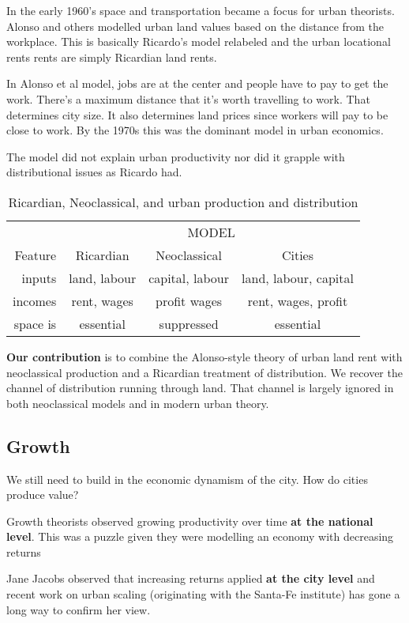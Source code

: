 \documentclass[]{article}
\begin{document}
In the early 1960’s space and transportation became a focus for urban theorists. Alonso and others modelled urban land values based on the distance from the workplace. This is basically Ricardo’s model relabeled and the urban locational rents rents are simply Ricardian land rents.

In Alonso et al model, jobs are at the center and people have to pay to get the work. There’s a maximum distance that it’s worth travelling to work. That determines city size. It also determines land prices since workers will pay to be close to work. By the 1970s this was the dominant model in urban economics. 

The model did not explain urban productivity nor did it grapple with distributional issues as Ricardo had. 

\begin{table}[h!b]
    \centering
    \begin{tabular}{r|ccc}
         &\multicolumn{3}{c}{ MODEL} \\\cline{2-4}
Feature   &Ricardian   &Neoclassical &Cities \\\hline
inputs    & land, labour & capital, labour&land, labour, capital\\
incomes   & rent, wages  & profit wages &rent, wages, profit \\
space is  & essential   & suppressed& essential\\
    \end{tabular}
    \caption{Ricardian, Neoclassical, and urban production and distribution}
    \label{tab:my_label}
\end{table}

\textbf{Our contribution} is to combine the Alonso-style theory of urban land rent with neoclassical production and a Ricardian treatment of distribution.
We recover the channel of distribution running through land. 
That channel is largely ignored in both neoclassical models and in modern urban theory.

\subsection{Growth}
We still need to build in the economic dynamism of the city. 
How do cities produce value? 

Growth theorists observed growing productivity over time \textbf{at the national level}. This was a puzzle given they were modelling an economy with decreasing returns

Jane Jacobs observed that increasing returns applied \textbf{at the city level} and  recent work on urban scaling (originating with the Santa-Fe institute) has gone a long way to confirm her view.
\end{document}
